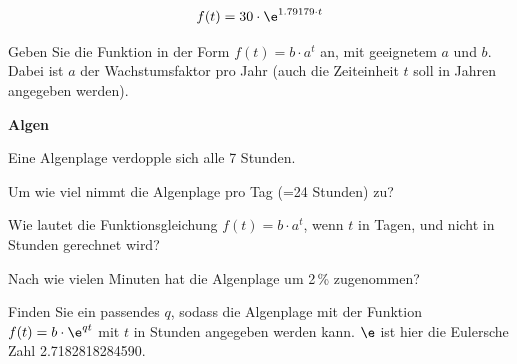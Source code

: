 $$f(t) = 30\cdot{}\e^{1.79179\cdot{}t} $$

\begin{bbwAufgabenBlock}

\item Geben Sie die Funktion in der Form $f(t) = b\cdot{}a^t$ an, mit
  geeignetem $a$ und $b$. Dabei ist $a$ der Wachstumsfaktor pro Jahr
  (auch die Zeiteinheit $t$ soll in Jahren angegeben werden).

\end{bbwAufgabenBlock}
\TNTeop{}

\newpage

\bbwActAufgabenNr{} \textbf{Algen}

Eine Algenplage verdopple sich alle 7 Stunden.

\begin{bbwAufgabenBlock}

\item Um wie viel nimmt die Algenplage pro Tag (=24 Stunden) zu?



\item Wie lautet die Funktionsgleichung $f(t)=b\cdot{}a^t$, wenn $t$ in Tagen, und nicht in Stunden gerechnet wird?


\item Nach wie vielen Minuten hat die Algenplage um 2\,\% zugenommen?


\item Finden Sie ein passendes $q$, sodass die Algenplage mit der Funktion $f(t) = b\cdot{}\e^{qt}$ mit $t$ in Stunden angegeben werden kann. $\e$ ist hier die Eulersche Zahl 2.7182818284590.



\end{bbwAufgabenBlock}


\platzFuerBerechnungenBisEndeSeite{}


\newpage

